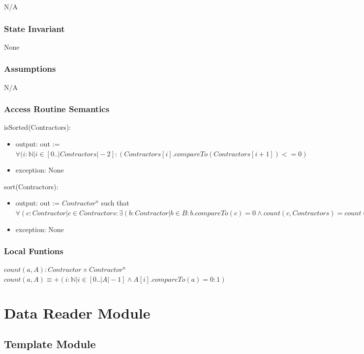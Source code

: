 \documentclass[12pt]{scrartcl}
\begin{document}
N/A

\subsubsection {State Invariant}

None

\subsubsection {Assumptions}

N/A

\subsubsection {Access Routine Semantics}

isSorted(Contractors):
\begin{itemize}
\item output: out := $\forall (i : \mathbb{N} | i \in [0..|Contractors|-2] : (Contractors[i].compareTo(Contractors[i+1]) <= 0)$
\item exception: None
\end{itemize}

sort(Contractors):
\begin{itemize}
\item output: out := $Contractor^n$ such that $\forall(c : Contractor | c \in Contractors : \exists(b : Contractor | b \in B : b.compareTo(c) = 0 \wedge count(c,Contractors) = count(b,B))) \wedge isSorted(B)$
\item exception: None
\end{itemize}

\subsubsection {Local Funtions}

$count(a,A) : Contractor \times Contractor^n$ \\
$count(a,A) \equiv +(i : \mathbb{N} | i \in [0..|A|-1] \wedge A[i].compareTo(a) = 0 : 1)$ \\

\newpage


\section {Data Reader Module}

\subsection{Template Module}
\end{document}
